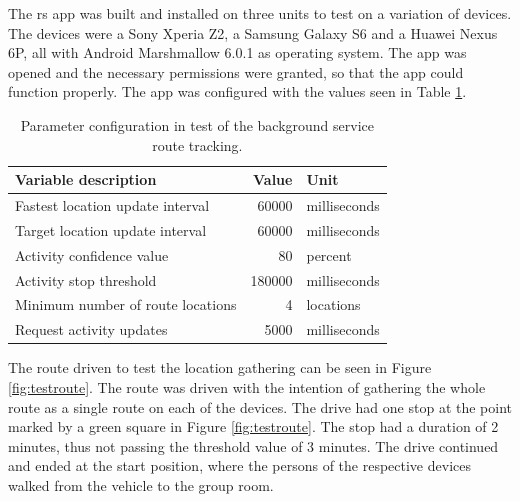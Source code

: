 The \gls{rs} app was built and installed on three units to test on a variation of devices.
The devices were a Sony Xperia Z2, a Samsung Galaxy S6 and a Huawei Nexus 6P, all with Android Marshmallow 6.0.1 as operating system.
The app was opened and the necessary permissions were granted, so that the app could function properly.
The app was configured with the values seen in Table \ref{tab:appconfig}.

\begin{table}[!ht]
	\centering
	\begin{tabular}{l r l}
		Variable description & Value & Unit\\
		\hline
		Fastest location update interval & 60000 & milliseconds\\
		Target location update interval & 60000 & milliseconds\\ 
		Activity confidence value & 80 & percent\\
		Activity stop threshold & 180000 & milliseconds\\
		Minimum number of route locations & 4 & locations \\
		Request activity updates & 5000 & milliseconds\\ 
	\end{tabular}
	\caption{Parameter configuration in test of the background service route tracking.}
	\label{tab:appconfig}
\end{table}

The route driven to test the location gathering can be seen in Figure \ref{fig:testroute}.
The route was driven with the intention of gathering the whole route as a single route on each of the devices.
The drive had one stop at the point marked by a green square in Figure \ref{fig:testroute}.
The stop had a duration of 2 minutes, thus not passing the threshold value of 3 minutes.
The drive continued and ended at the start position, where the persons of the respective devices walked from the vehicle to the group room.

